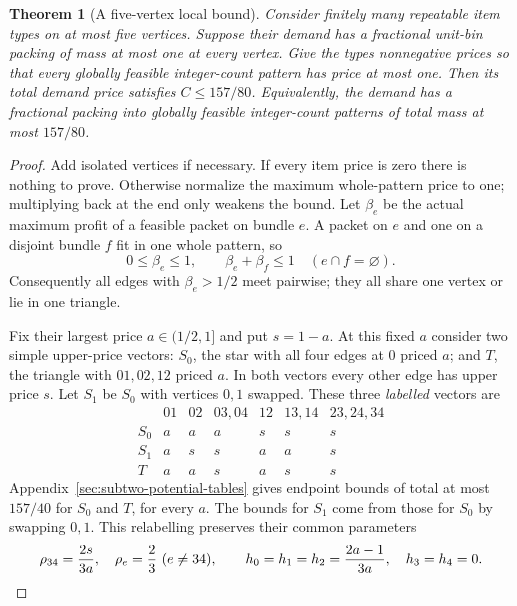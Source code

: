\documentclass[11pt]{article}
\newtheorem{theorem}{Theorem}[section]
\theoremstyle{definition}\newtheorem{algorithm}{Algorithm}[section]
\numberwithin{equation}{section}
\theoremstyle{remark}\newtheorem*{remark}{Remark}
\begin{document}
\begin{theorem}[A five-vertex local bound]
\label{thm:subtwo-local-five}
Consider finitely many repeatable item types on at most five vertices.
Suppose their demand has a fractional unit-bin packing of mass at most
one at every vertex. Give the types nonnegative prices so that every
globally feasible integer-count pattern has price at most one. Then
its total demand price satisfies $C\le157/80$.
Equivalently, the demand has a fractional packing into globally
feasible integer-count patterns of total mass at most $157/80$.
\end{theorem}
\begin{proof}
Add isolated vertices if necessary. If every item price is zero there
is nothing to prove. Otherwise normalize the maximum whole-pattern
price to one; multiplying back at the end only weakens the bound. Let $\beta_e$ be the actual maximum profit of a feasible
packet on bundle $e$. A packet on $e$ and one on a disjoint bundle
$f$ fit in one whole pattern, so
\[
 0\le\beta_e\le1,\qquad
 \beta_e+\beta_f\le1\quad(e\cap f=\varnothing).
\]
Consequently all edges with $\beta_e>1/2$ meet pairwise; they all share one vertex or lie in one triangle.

Fix their largest price $a\in(1/2,1]$ and put $s=1-a$.
At this fixed $a$ consider two simple upper-price vectors:
$S_0$, the star with all four edges at $0$ priced $a$; and $T$,
the triangle with $01,02,12$ priced $a$. In both vectors every other edge has upper price $s$. Let $S_1$ be $S_0$ with
vertices $0,1$ swapped. These three \emph{labelled} vectors are
\begin{equation}
\begin{array}{c|cccccc}
 &01&02&03,04&12&13,14&23,24,34\\ \hline
 S_0&a&a&a&s&s&s\\
 S_1&a&s&s&a&a&s\\
 T  &a&a&s&a&s&s
\end{array}                                                       \label{eq:subtwo-model-prices}
\end{equation}
Appendix~\ref{sec:subtwo-potential-tables} gives endpoint bounds of total at most
$157/40$ for $S_0$ and $T$, for every $a$. The bounds for $S_1$
come from those for $S_0$ by swapping $0,1$. This relabelling
preserves their common parameters
\begin{equation}
\rho_{34}={2s\over3a},\quad \rho_e={2\over3}\ (e\ne34),
 \qquad
 h_0=h_1=h_2={2a-1\over3a},\quad h_3=h_4=0.             \label{eq:subtwo-common-parameters}
\end{equation}


\end{proof}
\end{document}
